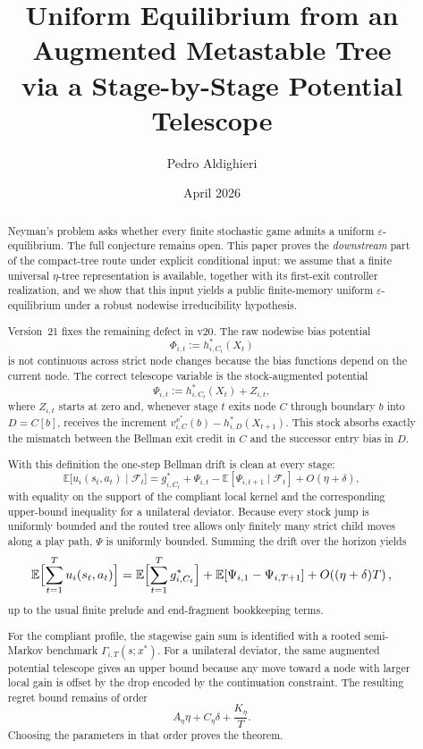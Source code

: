 \documentclass[12pt]{article}
\title{\textbf{Uniform Equilibrium from an Augmented Metastable Tree\\via a Stage-by-Stage Potential Telescope}}
\author{Pedro Aldighieri}
\date{April 2026}
\theoremstyle{definition}
\newcommand{\eps}{\varepsilon}
\newcommand{\E}{\mathbb{E}}
\newcommand{\1}{\mathbf{1}}
\newcommand{\cF}{\mathcal{F}}
\begin{document}
\maketitle





\begin{abstract}
Neyman's problem asks whether every finite stochastic game admits a uniform
$\eps$-equilibrium. The full conjecture remains open. This paper proves the
\emph{downstream} part of the compact-tree route under explicit conditional input:
we assume that a finite universal $\eta$-tree representation is available,
together with its first-exit controller realization, and we show that this input
yields a public finite-memory uniform $\eps$-equilibrium under a robust
nodewise irreducibility hypothesis.

Version~21 fixes the remaining defect in v20. The raw nodewise bias potential
\[
\Phi_{i,t}:=h_{i,C_t}^*(X_t)
\]
is not continuous across strict node changes because the bias functions depend on
the current node. The correct telescope variable is the stock-augmented
potential
\[
\Psi_{i,t}:=h_{i,C_t}^*(X_t)+Z_{i,t},
\]
where $Z_{i,t}$ starts at zero and, whenever stage $t$ exits node $C$ through
boundary $b$ into $D=C[b]$, receives the increment
$v_{i,C}^{x^*}(b)-h_{i,D}^*(X_{t+1})$. This stock absorbs exactly the mismatch
between the Bellman exit credit in $C$ and the successor entry bias in $D$.

With this definition the one-step Bellman drift is clean at every stage:
\[
\E\bigl[u_i(s_t,a_t)\mid \cF_t\bigr]
=
g_{i,C_t}^*
+
\Psi_{i,t}
-
\E[\Psi_{i,t+1}\mid \cF_t]
+
O(\eta+\delta),
\]
with equality on the support of the compliant local kernel and the corresponding
upper-bound inequality for a unilateral deviator. Because every stock jump is
uniformly bounded and the routed tree allows only finitely many strict child
moves along a play path, $\Psi$ is uniformly bounded. Summing the drift over the
horizon yields
\[
\E\Bigl[\sum_{t=1}^T u_i(s_t,a_t)\Bigr]
=
\E\Bigl[\sum_{t=1}^T g_{i,C_t}^*\Bigr]
+
\E[\Psi_{i,1}-\Psi_{i,T+1}]
+
O\!\left((\eta+\delta)T\right),
\]
up to the usual finite prelude and end-fragment bookkeeping terms.

For the compliant profile, the stagewise gain sum is identified with a rooted
semi-Markov benchmark $\Gamma_{i,T}(s;x^*)$. For a unilateral deviator, the same
augmented potential telescope gives an upper bound because any move toward a
node with larger local gain is offset by the drop encoded by the continuation
constraint. The resulting regret bound remains of order
\[
A_\eta\eta + C_\eta\delta + \frac{K_\eta}{T}.
\]
Choosing the parameters in that order proves the theorem.
\end{abstract}
\end{document}
